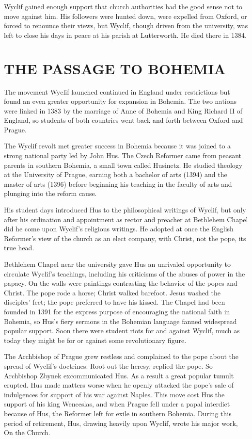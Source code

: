 Wyclif gained enough support that church authorities had the good sense not to move against him. His
followers were hunted down, were expelled from Oxford, or forced to renounce their views, but
Wyclif, though driven from the university, was left to close his days in peace at his parish at
Lutterworth. He died there in 1384.

\section{THE PASSAGE TO BOHEMIA}

The movement Wyclif launched continued in England under restrictions but found an even greater
opportunity for expansion in Bohemia. The two nations were linked in 1383 by the marriage of Anne of
Bohemia and King Richard II of England, so students of both countries went back and forth between
Oxford and Prague.

The Wyclif revolt met greater success in Bohemia because it was joined to a strong national party
led by John Hus. The Czech Reformer came from peasant parents in southern Bohemia, a small town
called Husinetz. He studied theology at the University of Prague, earning both a bachelor of arts
(1394) and the master of arts (1396) before beginning his teaching in the faculty of arts and
plunging into the reform cause.

His student days introduced Hus to the philosophical writings of Wyclif, but only after his
ordination and appointment as rector and preacher at Bethlehem Chapel did he come upon Wyclif’s
religious writings. He adopted at once the English Reformer’s view of the church as an elect
company, with Christ, not the pope, its true head.

Bethlehem Chapel near the university gave Hus an unrivaled opportunity to circulate Wyclif’s
teachings, including his criticisms of the abuses of power in the papacy. On the walls were
paintings contrasting the behavior of the popes and Christ. The pope rode a horse; Christ walked
barefoot. Jesus washed the disciples’ feet; the pope preferred to have his kissed. The Chapel had
been founded in 1391 for the express purpose of encouraging the national faith in Bohemia, so Hus’s
fiery sermons in the Bohemian language fanned widespread popular support. Soon there were student
riots for and against Wyclif, much as today they might be for or against some revolutionary figure.

The Archbishop of Prague grew restless and complained to the pope about the spread of Wyclif’s
doctrines. Root out the heresy, replied the pope. So Archbishop Zbynek excommunicated Hus. As a
result a great popular tumult erupted. Hus made matters worse when he openly attacked the pope’s
sale of indulgences for support of his war against Naples. This move cost Hus the support of his
king Wenceslas, and when Prague fell under a papal interdict because of Hus, the Reformer left for
exile in southern Bohemia. During this period of retirement, Hus, drawing heavily upon Wyclif, wrote
his major work, On the Church.

